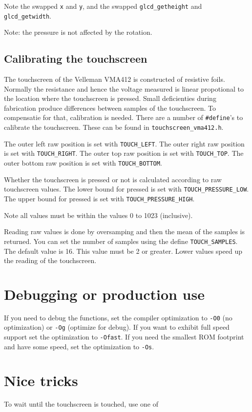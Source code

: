 \documentclass[12pt]{article}
\begin{document}
Note the swapped \lstinline|x| and \lstinline|y|, and the swapped \lstinline|glcd_getheight| and \lstinline|glcd_getwidth|.

Note: the pressure is not affected by the rotation.

\subsection{Calibrating the touchscreen}
The touchscreen of the Velleman VMA412 is constructed of resistive foils. Normally the resistance and hence the voltage measured is linear propotional to the location where the touchscreen is pressed. Small deficienties during fabrication produce differences between samples of the touchscreen. To compensatie for that, calibration is needed. There are a number of \lstinline|#define|'s to calibrate the touchscreen. These can be found in \lstinline|touchscreen_vma412.h|.

The outer left raw position is set with \lstinline|TOUCH_LEFT|. The outer right raw position is set with \lstinline|TOUCH_RIGHT|. The outer top raw position is set with \lstinline|TOUCH_TOP|. The outer bottom raw position is set with \lstinline|TOUCH_BOTTOM|.

Whether the touchscreen is pressed or not is calculated according to raw touchscreen values. The lower bound for pressed is set with \lstinline|TOUCH_PRESSURE_LOW|. The upper bound for pressed is set with \lstinline|TOUCH_PRESSURE_HIGH|.

Note all values must be within the values 0 to 1023 (inclusive).

Reading raw values is done by oversamping and then the mean of the samples is returned. You can set the number of samples using the define \lstinline|TOUCH_SAMPLES|. The default value is 16. This value must be 2 or greater. Lower values speed up the reading of the touchscreen.

\section{Debugging or production use}
If you need to debug the functions, set the compiler optimization to \lstinline|-O0| (no optimization) or \lstinline|-Og| (optimize for debug). If you want to exhibit full speed support set the optimization to \lstinline|-Ofast|. If you need the smallest ROM footprint and have some speed, set the optimization to \lstinline|-Os|.

\section{Nice tricks}
To wait until the touchscreen is touched, use one of
\end{document}
